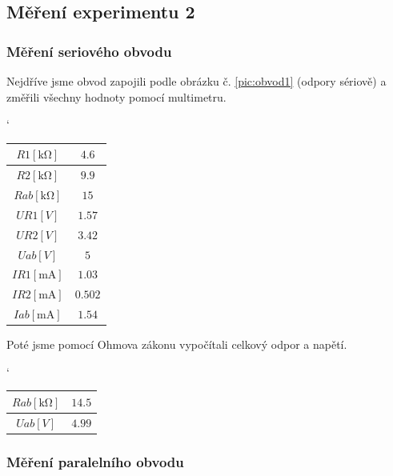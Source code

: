 \documentclass[11pt,a4paper,titlepage]{article}
\begin{document}
\subsection{Měření experimentu 2}

\subsubsection{Měření seriového obvodu}

Nejdříve jsme obvod zapojili podle obrázku č. \ref{pic:obvod1} (odpory sériově) a změřili všechny hodnoty pomocí multimetru.

\begin{table}[h]
\begin{center}
\catcode`
\begin{tabular}{|c|c|} \hline
 $R1[\si{\kilo\ohm}]$ &$4.6$ \\ \hline
 $R2[\si{\kilo\ohm}]$ &$9.9$ \\ \hline
 $Rab[\si{\kilo\ohm}]$ &$15$ \\ \hline
 $UR1[V]$ &$1.57$ \\ \hline
 $UR2[V]$ &$3.42$ \\ \hline
 $Uab[V]$ &$5$ \\ \hline
 $IR1[\si{\milli\ampere}]$ &$1.03$ \\ \hline
 $IR2[\si{\milli\ampere}]$ &$0.502$ \\ \hline
 $Iab[\si{\milli\ampere}]$ &$1.54$ \\ \hline
\end{tabular}
\end{center}
\end{table}

Poté jsme pomocí Ohmova zákonu vypočítali celkový odpor a napětí.

\begin{table}[h]
\begin{center}
\catcode`
\begin{tabular}{|c|c|} \hline
 $Rab[\si{\kilo\ohm}]$ &$14.5$ \\ \hline
 $Uab[V]$ &$4.99$ \\ \hline
\end{tabular}
\end{center}
\end{table}


\subsubsection{Měření paralelního obvodu}
\end{document}
